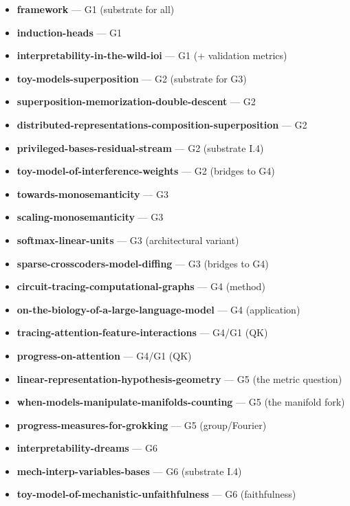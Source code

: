 \begin{itemize}
\item \textbf{framework} --- G1 (substrate for all)
\item \textbf{induction-heads} --- G1
\item \textbf{interpretability-in-the-wild-ioi} --- G1 (+ validation metrics)
\item \textbf{toy-models-superposition} --- G2 (substrate for G3)
\item \textbf{superposition-memorization-double-descent} --- G2
\item \textbf{distributed-representations-composition-superposition} --- G2
\item \textbf{privileged-bases-residual-stream} --- G2 (substrate I.4)
\item \textbf{toy-model-of-interference-weights} --- G2 (bridges to G4)
\item \textbf{towards-monosemanticity} --- G3
\item \textbf{scaling-monosemanticity} --- G3
\item \textbf{softmax-linear-units} --- G3 (architectural variant)
\item \textbf{sparse-crosscoders-model-diffing} --- G3 (bridges to G4)
\item \textbf{circuit-tracing-computational-graphs} --- G4 (method)
\item \textbf{on-the-biology-of-a-large-language-model} --- G4 (application)
\item \textbf{tracing-attention-feature-interactions} --- G4/G1 (QK)
\item \textbf{progress-on-attention} --- G4/G1 (QK)
\item \textbf{linear-representation-hypothesis-geometry} --- G5 (the metric question)
\item \textbf{when-models-manipulate-manifolds-counting} --- G5 (the manifold fork)
\item \textbf{progress-measures-for-grokking} --- G5 (group/Fourier)
\item \textbf{interpretability-dreams} --- G6
\item \textbf{mech-interp-variables-bases} --- G6 (substrate I.4)
\item \textbf{toy-model-of-mechanistic-unfaithfulness} --- G6 (faithfulness)
\end{itemize}


\printbibliography

